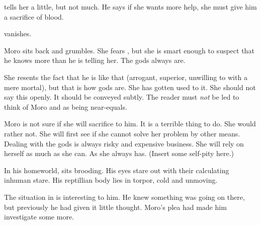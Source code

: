 % 
% 
% 
% 
% 
% 
% 
% 

\Nasshikerr tells her a little, but not much.
He says if she wants more help, she must give him a sacrifice of blood.

\Nasshikerr vanishes. 

Moro sits back and grumbles. 
She fears \Nasshikerr, but she is smart enough to suspect that he knows more than he is telling her. 
The gods always are. 

She resents the fact that he is like that (arrogant, superior, unwilling to \cooperate with a mere mortal), but that is how gods are.
She has gotten used to it. 
She should not say this openly.
It should be conveyed subtly.
The reader must \emph{not} be led to think of Moro and \Nasshikerr as being near-equals. 

Moro is not sure if she will sacrifice to him.
It is a terrible thing to do.
She would rather not.
She will first see if she cannot solve her problem by other means. 
Dealing with the gods is always risky and expensive business. 
She will rely on herself as much as she can. 
As she always has.
(Insert some self-pity here.)









\begin{comment}
  \section{\Nasshikerr broods}
\end{comment}
\new
In his homeworld, \Nasshikerr sits brooding. 
His \ophidian eyes stare out with their calculating inhuman stare. 
His reptillian body lies in torpor, cold and unmoving. 



The situation in \Malcur is interesting to him. 
He knew something was going on there, but previously he had given it little thought. 
Moro's plea had made him investigate some more. 

